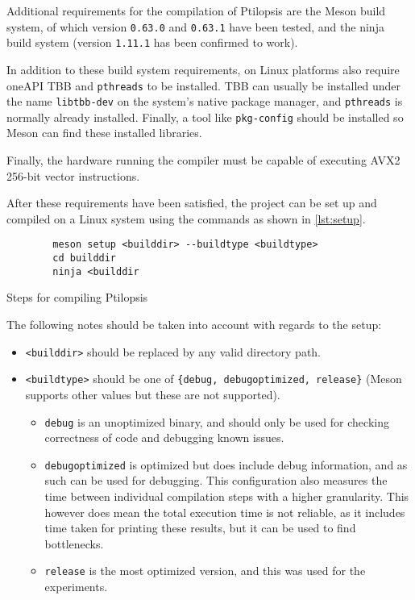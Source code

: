 \documentclass[12pt,dvipsnames]{article}
\newcommand{\mono}[1]{\texttt{#1}}
\begin{document}
Additional requirements for the compilation of Ptilopsis are the Meson build system, of which version \mono{0.63.0} and \mono{0.63.1} have been tested, and the ninja build system (version \mono{1.11.1} has been confirmed to work).

In addition to these build system requirements, on Linux platforms also require oneAPI TBB \cite{oneapi} and \mono{pthreads} to be installed. TBB can usually be installed under the name \mono{libtbb-dev} on the system's native package manager, and \mono{pthreads} is normally already installed. Finally, a tool like \mono{pkg-config} should be installed so Meson can find these installed libraries. 

Finally, the hardware running the compiler must be capable of executing AVX2 256-bit vector instructions.

After these requirements have been satisfied, the project can be set up and compiled on a Linux system using the commands as shown in \autoref{lst:setup}.

\begin{listing}[h]
    \begin{verbatim}
        meson setup <builddir> --buildtype <buildtype>
        cd builddir
        ninja <builddir
    \end{verbatim}
    \caption{Steps for compiling Ptilopsis}
    \label{lst:setup}
\end{listing}

The following notes should be taken into account with regards to the setup:
\begin{itemize}
    \item \mono{<builddir>} should be replaced by any valid directory path.
    \item \mono{<buildtype>} should be one of \mono{\{debug, debugoptimized, release\}} (Meson supports other values but these are not supported).
        \begin{itemize}
            \item \mono{debug} is an unoptimized binary, and should only be used for checking correctness of code and debugging known issues.
            \item \mono{debugoptimized} is optimized but does include debug information, and as such can be used for debugging.
                This configuration also measures the time between individual compilation steps with a higher granularity. This however does mean the total execution time is not reliable, as it includes time taken for printing these results, but it can be used to find bottlenecks.
            \item \mono{release} is the most optimized version, and this was used for the experiments.
        \end{itemize}
\end{itemize}
\end{document}
